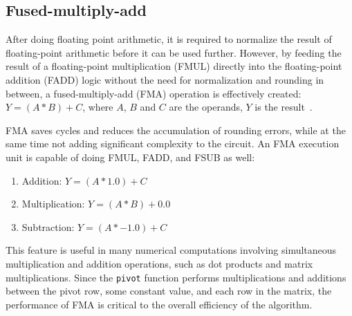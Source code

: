 \documentclass[logo,bsc,singlespacing,parskip]{infthesis}
\newcommand{\pivot}{\texttt{pivot}}
\newenvironment{compactlist}
{ \begin{enumerate}
    \setlength{\itemsep}{0pt}
    \setlength{\parskip}{0pt}
    \setlength{\parsep}{0pt}     
}
{ \end{enumerate} }
\begin{document}
\subsection{Fused-multiply-add}
\label{sec:FMA}

After doing floating point arithmetic, it is required to normalize the result of
floating-point arithmetic before it can be used further. However, by feeding the
result of a floating-point multiplication (FMUL) directly into the
floating-point addition (FADD) logic without the need for normalization and
rounding in between, a fused-multiply-add (FMA) operation is effectively
created: 
\begin{math}Y = (A * B) + C \end{math}, where 
\begin{math}A\end{math},
\begin{math}B\end{math} and
\begin{math}C\end{math} are the operands, 
\begin{math}Y\end{math} is the result~\cite{CARD}.

FMA saves cycles and reduces the accumulation of rounding errors, while at the same
time not adding significant complexity to the circuit. An FMA execution unit is
capable of doing FMUL, FADD, and FSUB as well: 
\begin{compactlist} 
\item[] Addition: \begin{math}Y = (A * 1.0) + C \end{math} 
\item[] Multiplication: \begin{math} Y = (A * B) + 0.0 \end{math} 
\item[] Subtraction: \begin{math} Y = (A * -1.0) + C\end{math} 
\end{compactlist} 

This feature is useful in many numerical computations involving
simultaneous multiplication and addition operations, such as dot products and
matrix multiplications. Since the \pivot{} function performs multiplications and
additions between the pivot row, some constant value, and each row in the matrix,
the performance of FMA is critical to the overall efficiency of the algorithm. 
\end{document}
